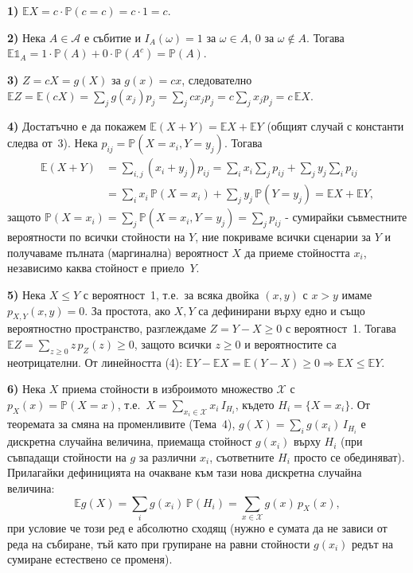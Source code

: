 \begin{proofbox}
\textbf{1)} $\mathbb EX = c\cdot\mathbb P(c=c)=c\cdot1=c$.

\textbf{2)} Нека $A\in\mathcal A$ е събитие и $I_A(\omega)=1$
за $\omega\in A$, $0$ за $\omega\notin A$. Тогава $\mathbb E\mathbb
1_A = 1\cdot\mathbb P(A) + 0\cdot\mathbb P(A^c) = \mathbb P(A)$.

\textbf{3)} $Z=cX=g(X)$ за $g(x)=cx$, следователно $\mathbb EZ =
\mathbb E(cX) = \sum_j g(x_j)p_j = \sum_j cx_j p_j = c\sum_j x_j p_j =
c\,\mathbb EX$.

\textbf{4)} Достатъчно е да покажем $\mathbb E(X+Y)=\mathbb EX+
\mathbb EY$ (общият случай с константи следва от~3). Нека $p_{ij}=
\mathbb P(X=x_i,Y=y_j)$. Тогава
\begin{align*}
  \mathbb E(X+Y) &= \sum_{i,j}(x_i+y_j)p_{ij} = \sum_i x_i\sum_j p_{ij} + \sum_j y_j\sum_i p_{ij}\\
  &= \sum_i x_i\,\mathbb P(X=x_i) + \sum_j y_j\,\mathbb P(Y=y_j) = \mathbb EX+\mathbb EY,
\end{align*}
защото $\mathbb P(X=x_i)=\sum_j\mathbb P(X=x_i,Y=y_j)=\sum_j p_{ij}$
- сумирайки съвместните вероятности по всички стойности на $Y$, ние
покриваме всички сценарии за $Y$ и получаваме пълната (маргинална)
вероятност $X$ да приеме стойността $x_i$, независимо каква стойност
е приело~$Y$.

\textbf{5)} Нека $X\le Y$ с вероятност~1, т.е.\ за всяка двойка
$(x,y)$ с $x>y$ имаме $p_{X,Y}(x,y)=0$. За простота, ако $X,Y$ са
дефинирани върху едно и също вероятностно пространство, разглеждаме
$Z=Y-X\ge0$ с вероятност~1. Тогава $\mathbb EZ = \sum_{z\ge0} z\,
p_Z(z)\ge 0$, защото всички $z\ge0$ и вероятностите са неотрицателни.
От линейността (4): $\mathbb EY-\mathbb EX=\mathbb E(Y-X)\ge 0
\Rightarrow \mathbb EX\le\mathbb EY$.

\textbf{6)} Нека $X$ приема стойности в изброимото множество
$\mathcal X$ с $p_X(x)=\mathbb P(X=x)$, т.е.\ $X=\sum_{x_i\in
\mathcal X} x_i\,I_{H_i}$, където $H_i=\{X=x_i\}$. От
теоремата за смяна на променливите (Тема~4), $g(X) = \sum_i
g(x_i)\,I_{H_i}$ е дискретна случайна величина, приемаща
стойност $g(x_i)$ върху $H_i$ (при съвпадащи стойности на $g$ за
различни $x_i$, съответните $H_i$ просто се обединяват). Прилагайки
дефиницията на очакване към тази нова дискретна случайна величина:
\[
  \mathbb Eg(X) = \sum_i g(x_i)\,\mathbb P(H_i) = \sum_{x\in\mathcal X} g(x)\,p_X(x),
\]
при условие че този ред е абсолютно сходящ (нужно е сумата да не
зависи от реда на събиране, тъй като при групиране на равни стойности
$g(x_i)$ редът на сумиране естествено се променя). \qedbg


\end{proofbox}
